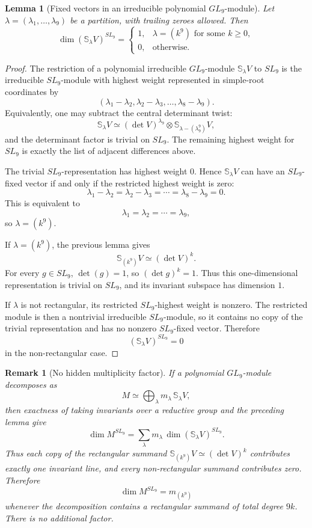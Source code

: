 \documentclass[11pt]{article}
\newtheorem{lemma}{Lemma}
\newtheorem{remark}{Remark}
\newcommand{\Schur}{\mathbb S}
\begin{document}
\begin{lemma}[Fixed vectors in an irreducible polynomial \(GL_9\)-module]
Let \(\lambda=(\lambda_1,\ldots,\lambda_9)\) be a partition, with trailing
zeroes allowed. Then
\[
    \dim(\Schur_\lambda V)^{SL_9}
    =
    \begin{cases}
    1, & \lambda=(k^9)\text{ for some }k\geq 0,\\
    0, & \text{otherwise.}
    \end{cases}
\]
\end{lemma}

\begin{proof}
The restriction of a polynomial irreducible \(GL_9\)-module
\(\Schur_\lambda V\) to \(SL_9\) is the irreducible \(SL_9\)-module with highest
weight represented in simple-root coordinates by
\[
    (\lambda_1-\lambda_2,\lambda_2-\lambda_3,\ldots,\lambda_8-\lambda_9).
\]
Equivalently, one may subtract the central determinant twist:
\[
    \Schur_\lambda V
    \simeq
    (\det V)^{\lambda_9}\otimes
    \Schur_{\lambda-(\lambda_9^9)}V,
\]
and the determinant factor is trivial on \(SL_9\). The remaining highest weight
for \(SL_9\) is exactly the list of adjacent differences above.

The trivial \(SL_9\)-representation has highest weight \(0\). Hence
\(\Schur_\lambda V\) can have an \(SL_9\)-fixed vector if and only if the
restricted highest weight is zero:
\[
    \lambda_1-\lambda_2=\lambda_2-\lambda_3=\cdots=\lambda_8-\lambda_9=0.
\]
This is equivalent to
\[
    \lambda_1=\lambda_2=\cdots=\lambda_9,
\]
so \(\lambda=(k^9)\).

If \(\lambda=(k^9)\), the previous lemma gives
\[
    \Schur_{(k^9)}V\simeq(\det V)^k.
\]
For every \(g\in SL_9\), \(\det(g)=1\), so \((\det g)^k=1\). Thus this
one-dimensional representation is trivial on \(SL_9\), and its invariant
subspace has dimension \(1\).

If \(\lambda\) is not rectangular, its restricted \(SL_9\)-highest weight is
nonzero. The restricted module is then a nontrivial irreducible \(SL_9\)-module,
so it contains no copy of the trivial representation and has no nonzero
\(SL_9\)-fixed vector. Therefore
\[
    (\Schur_\lambda V)^{SL_9}=0
\]
in the non-rectangular case.
\end{proof}

\begin{remark}[No hidden multiplicity factor]
If a polynomial \(GL_9\)-module decomposes as
\[
    M\simeq\bigoplus_\lambda m_\lambda\,\Schur_\lambda V,
\]
then exactness of taking invariants over a reductive group and the preceding
lemma give
\[
    \dim M^{SL_9}
    =
    \sum_\lambda m_\lambda\,\dim(\Schur_\lambda V)^{SL_9}.
\]
Thus each copy of the rectangular summand
\(\Schur_{(k^9)}V\simeq(\det V)^k\) contributes exactly one invariant line, and
every non-rectangular summand contributes zero. Therefore
\[
    \dim M^{SL_9}=m_{(k^9)}
\]
whenever the decomposition contains a rectangular summand of total degree
\(9k\). There is no additional factor.
\end{remark}
\end{document}
